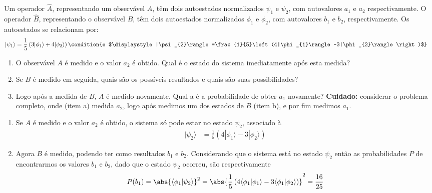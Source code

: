 	 \begin{prob}
		 Um operador $\hat{A}$, representando um observável $A$, têm dois autoestados normalizados $\psi_{1}$ e $\psi_{2}$, com autovalores $a_{1}$ e $a_{2}$ respectivamente. O operador $\hat{B}$, representando o observável $B$, têm dois autoestados normalizados $\phi_{1}$ e $\phi_{2}$, com autovalores $b_{1}$ e $b_{2}$, respectivamente. Os autoestados se relacionam por:
		 \begin{align}
			 |\psi_{1}\rangle &= \frac{1}{5}\left(3|\phi_{1}\rangle+4|\phi_{2}\rangle\right)\condition{e $\displaystyle|\psi_{2}\rangle=\frac{1}{5}\left(4|\phi_{1}\rangle-3|\phi_{2}\rangle\right)$}  
		 \end{align}
		 \begin{enumerate}[label=\alph *)]
			 \item O observável $A$ é medido e o valor $a_{2}$ é obtido. Qual é o estado do sistema imediatamente após esta medida?
			 \item Se $B$ é medido em seguida, quais são os possíveis resultados e quais são suas possibilidades?
			 \item Logo após a medida de $B$, $A$ é medido novamente. Qual a  é a probabilidade de obter $a_{1}$ novamente? \textbf{Cuidado:} considerar o problema completo, onde (item a) medida $a_{2}$, logo após medimos um  dos estados de $B$ (item b), e por fim  medimos $a_{1}$.
		 \end{enumerate}
		 \begin{sol}
		 	\begin{enumerate}[label=\alph *)]
				\item Se $A$ é medido e o valor $a_{2}$ é obtido, o sistema só pode estar no estado $\psi_{2}$, associado à
					\begin{align}
						|{\psi_{2}}\rangle &= \frac{1}{5}\left(4|{\phi_{1}}\rangle-3|{\phi_{2}}\rangle\right) 
					\end{align}
				\item Agora $B$ é medido, podendo ter como resultados $b_{1}$ e $b_{2}$. Considerando que o sistema está no estado $\psi_{2}$ então as probabilidades $P$ de encontrarmos os valores $b_{1}$ e $b_{2}$, dado que o estado $\psi_{2}$ ocorreu, são respectivamente
					\begin{subequations}
						\begin{align}
							P(b_{1}) &= \abs{\langle{\phi_{1}}|{\psi_{2}}\rangle}^{2}=\abs{\frac{1}{5}\left(4\langle{\phi_{1}}|{\phi_{1}}\rangle-3\langle{\phi_{1}}|{\phi_{2}}\rangle\right)}^{2} = \frac{16}{25}\\

\end{align}
\end{subequations}
\end{enumerate}
\end{sol}
\end{prob}

